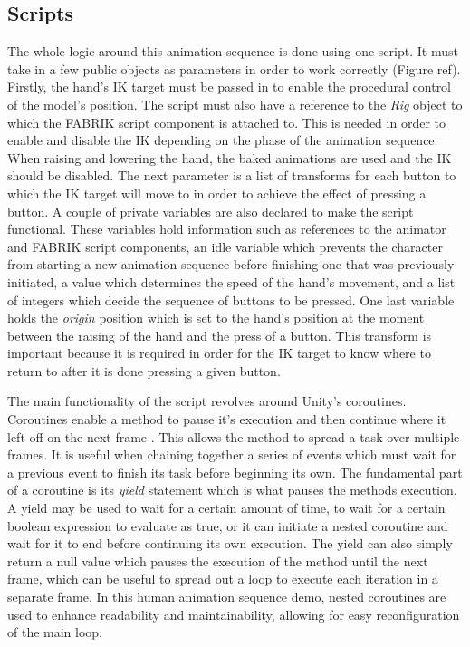 \subsection{Scripts}
The whole logic around this animation sequence is done using one script. It must
take in a few public objects as parameters in order to work correctly (Figure
ref). Firstly, the hand's IK target must be passed in to enable the procedural
control of the model's position. The script must also have a reference to the
\textit{Rig} object to which the FABRIK script component is attached to. This is
needed in order to enable and disable the IK depending on the phase of the
animation sequence. When raising and lowering the hand, the baked animations are
used and the IK should be disabled. The next parameter is a list of transforms
for each button to which the IK target will move to in order to achieve the
effect of pressing a button. A couple of private variables are also declared to
make the script functional. These variables hold information such as references
to the animator and FABRIK script components, an idle variable which prevents
the character from starting a new animation sequence before finishing one that
was previously initiated, a value which determines the speed of the hand's
movement, and a list of integers which decide the sequence of buttons to be
pressed. One last variable holds the \textit{origin} position which is set to
the hand's position at the moment between the raising of the hand and the press
of a button. This transform is important because it is required in order for the
IK target to know where to return to after it is done pressing a given button. 

The main functionality of the script revolves around Unity's coroutines.
Coroutines enable a method to pause it's execution and then continue where it
left off on the next frame \cite{unity_coroutines}. This allows the method to
spread a task over multiple frames. It is useful when chaining together a series
of events which must wait for a previous event to finish its task before
beginning its own. The fundamental part of a coroutine is its \textit{yield}
statement which is what pauses the methods execution. A yield may be used to
wait for a certain amount of time, to wait for a certain boolean expression to
evaluate as true, or it can initiate a nested coroutine and wait for it to end
before continuing its own execution. The yield can also simply return a null
value which pauses the execution of the method until the next frame, which can
be useful to spread out a loop to execute each iteration in a separate frame. In
this human animation sequence demo, nested coroutines are used to enhance
readability and maintainability, allowing for easy reconfiguration of the main
loop. 

